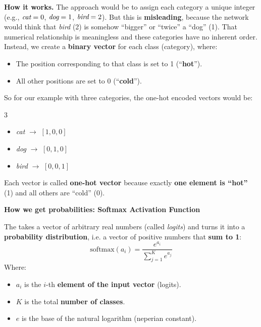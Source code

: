 \highspace
\textcolor{Green3}{ \textbf{How it works.}} The \naive approach would be to assign each category a unique integer (e.g., $\emph{cat} = 0$, $\emph{dog} = 1$, $\emph{bird} = 2$). But this is \textbf{misleading}, because the network would think that \emph{bird} (2) is somehow ``bigger'' or ``twice'' a ``dog'' (1). That numerical relationship is meaningless and these categories have no inherent order. Instead, we create a \textbf{binary vector} for each class (category), where:
\begin{itemize}
    \item The position corresponding to that class is set to 1 (``\textbf{hot}'').
    \item All other positions are set to 0 (``\textbf{cold}'').
\end{itemize}
So for our example with three categories, the one-hot encoded vectors would be:
\begin{multicols}{3}
    \begin{itemize}
        \item \emph{cat} $\rightarrow$ $\left[1, 0, 0\right]$
        \item \emph{dog} $\rightarrow$ $\left[0, 1, 0\right]$
        \item \emph{bird} $\rightarrow$ $\left[0, 0, 1\right]$
    \end{itemize}
\end{multicols}

\noindent
Each vector is called \textbf{one-hot vector} because exactly \textbf{one element is ``hot''} (1) and all others are ``cold'' (0).

\highspace
\begin{flushleft}
    \textcolor{Green3}{ \textbf{How we get probabilities: Softmax Activation Function}}
    \label{def:softmax-activation-function}
\end{flushleft}
The  takes a vector of arbitrary real numbers (called \emph{logits}) and turns it into a \textbf{probability distribution}, i.e. a vector of positive numbers that \textbf{sum to 1}:
\begin{equation}
    \text{softmax}(a_{i}) = \dfrac{e^{a_{i}}}{\displaystyle \sum_{j=1}^{K} e^{a_{j}}}
\end{equation}
Where:
\begin{itemize}
    \item $a_{i}$ is the $i$-th \textbf{element of the input vector} (logits).
    \item $K$ is the total \textbf{number of classes}.
    \item $e$ is the base of the natural logarithm (neperian constant).
\end{itemize}


